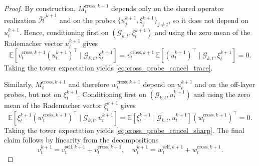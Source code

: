\documentclass{pkumelon}
\theoremstyle{plain}
\newcommand{\E}{\mathbb{E}}
\begin{document}
\begin{proof}
By construction, $M_t^{\mathrm{cross},k+1}$ depends only on the shared operator realization $\tilde{\mathcal H}^{k+1}$ and on the probes $\{u_j^{k+1},\xi_j^{k+1}\}_{j\neq t}$, so it does not depend on $u_t^{k+1}$. Hence, conditioning first on $(\mathcal G_{k,t},\xi_t^{k+1})$ and using the zero mean of the Rademacher vector $u_t^{k+1}$ gives
\begin{equation*}
\E\!\left[v_t^{\mathrm{cross},k+1}(u_t^{k+1})^\top\mid \mathcal G_{k,t},\xi_t^{k+1}\right] = v_t^{\mathrm{cross},k+1}\,\E\!\left[(u_t^{k+1})^\top\mid \mathcal G_{k,t},\xi_t^{k+1}\right] =0.
\end{equation*}
Taking the tower expectation yields \eqref{eq:cross_probe_cancel_trace}.

Similarly, $M_t^{\mathrm{cross},k+1}$ and therefore $w_t^{\mathrm{cross},k+1}$ depend on $u_t^{k+1}$ and on the off-layer probes, but not on $\xi_t^{k+1}$. Conditioning first on $(\mathcal G_{k,t},u_t^{k+1})$ and using the zero mean of the Rademacher vector $\xi_t^{k+1}$ gives
\begin{equation*}
\E\!\left[\xi_t^{k+1}(w_t^{\mathrm{cross},k+1})^\top\mid \mathcal G_{k,t},u_t^{k+1}\right] = \E\!\left[\xi_t^{k+1}\mid \mathcal G_{k,t},u_t^{k+1}\right](w_t^{\mathrm{cross},k+1})^\top =0.
\end{equation*}
Taking the tower expectation yields \eqref{eq:cross_probe_cancel_sharp}. The final claim follows by linearity from the decompositions
\begin{equation*}
v_t^{k+1}=v_t^{\mathrm{self},k+1}+v_t^{\mathrm{cross},k+1}, \quad w_t^{k+1}=w_t^{\mathrm{self},k+1}+w_t^{\mathrm{cross},k+1}.
\end{equation*}
\end{proof}
\end{document}
